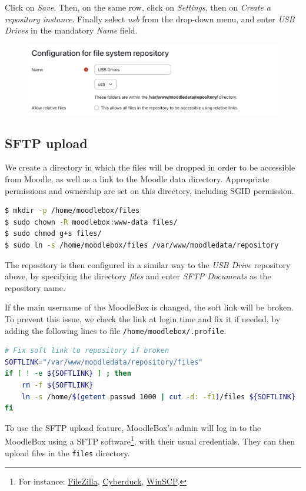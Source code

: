 \documentclass[12pt]{article}
\begin{document}
Click on \emph{Save}.
Then, on the same row, click on \emph{Settings}, then on \emph{Create a repository instance}.
Finally select \emph{usb} from the drop-down menu, and enter \emph{USB Drives} in the mandatory \emph{Name} field.
\begin{figure}[!ht]
\centering
\includegraphics[width=14cm]{repo-filesystem-usb-2.png}
\end{figure}

\subsection{SFTP upload}

We create a directory in which the files will be dropped in order to be accessible from Moodle, as well as a link to the Moodle data directory.
Appropriate permissions and ownership are set on this directory, including SGID permission.

\begin{lstlisting}[language=bash]
$ mkdir -p /home/moodlebox/files
$ sudo chown -R moodlebox:www-data files/
$ sudo chmod g+s files/
$ sudo ln -s /home/moodlebox/files /var/www/moodledata/repository
\end{lstlisting}

The repository is then configured in a similar way to the \textsl{USB Drive} repository above, by specifying the directory \emph{files} and enter \emph{SFTP Documents} as the repository name.

If the main username of the MoodleBox is changed, the soft link will be broken.
To prevent this issue, we check the link at login time and fix it if needed, by adding the following lines to file \lstinline{/home/moodlebox/.profile}.

\begin{lstlisting}[language=bash]
# Fix soft link to repository if broken
SOFTLINK="/var/www/moodledata/repository/files"
if [ ! -e ${SOFTLINK} ] ; then
    rm -f ${SOFTLINK}
    ln -s /home/$(getent passwd 1000 | cut -d: -f1)/files ${SOFTLINK}
fi
\end{lstlisting}

To use the SFTP upload feature, MoodleBox's admin will log in to the MoodleBox using a SFTP software\footnote{For instance: \href{https://filezilla-project.org/}{FileZilla}, \href{https://cyberduck.io/}{Cyberduck}, \href{http://winscp.net/}{WinSCP}.}, with their usual credentials.
They can then upload files in the \lstinline{files} directory.
\end{document}
